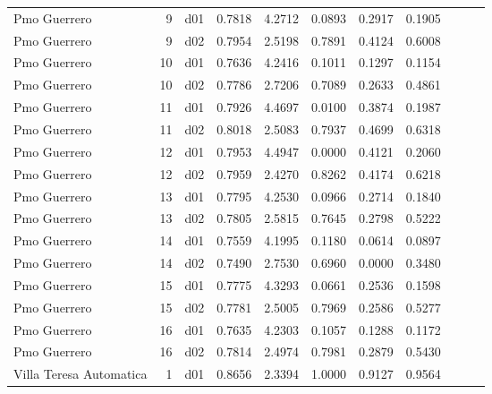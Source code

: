 \begin{landscape}
\begin{longtable}{p{2cm}rrrrrrrrrr}
            Pmo Guerrero  &          9 &     d01 &   0.7818 &  4.2712 &        0.0893 &           0.2917 &  0.1905 \\
            Pmo Guerrero  &          9 &     d02 &   0.7954 &  2.5198 &        0.7891 &           0.4124 &  0.6008 \\
            Pmo Guerrero  &         10 &     d01 &   0.7636 &  4.2416 &        0.1011 &           0.1297 &  0.1154 \\
            Pmo Guerrero  &         10 &     d02 &   0.7786 &  2.7206 &        0.7089 &           0.2633 &  0.4861 \\
            Pmo Guerrero  &         11 &     d01 &   0.7926 &  4.4697 &        0.0100 &           0.3874 &  0.1987 \\
            Pmo Guerrero  &         11 &     d02 &   0.8018 &  2.5083 &        0.7937 &           0.4699 &  0.6318 \\
            Pmo Guerrero  &         12 &     d01 &   0.7953 &  4.4947 &        0.0000 &           0.4121 &  0.2060 \\
            Pmo Guerrero  &         12 &     d02 &   0.7959 &  2.4270 &        0.8262 &           0.4174 &  0.6218 \\
            Pmo Guerrero  &         13 &     d01 &   0.7795 &  4.2530 &        0.0966 &           0.2714 &  0.1840 \\
            Pmo Guerrero  &         13 &     d02 &   0.7805 &  2.5815 &        0.7645 &           0.2798 &  0.5222 \\
            Pmo Guerrero  &         14 &     d01 &   0.7559 &  4.1995 &        0.1180 &           0.0614 &  0.0897 \\
            Pmo Guerrero  &         14 &     d02 &   0.7490 &  2.7530 &        0.6960 &           0.0000 &  0.3480 \\
            Pmo Guerrero  &         15 &     d01 &   0.7775 &  4.3293 &        0.0661 &           0.2536 &  0.1598 \\
            Pmo Guerrero  &         15 &     d02 &   0.7781 &  2.5005 &        0.7969 &           0.2586 &  0.5277 \\
            Pmo Guerrero  &         16 &     d01 &   0.7635 &  4.2303 &        0.1057 &           0.1288 &  0.1172 \\
            Pmo Guerrero  &         16 &     d02 &   0.7814 &  2.4974 &        0.7981 &           0.2879 &  0.5430 \\
 Villa Teresa Automatica  &          1 &     d01 &   0.8656 &  2.3394 &        1.0000 &           0.9127 &  0.9564 \\

\end{longtable}
\end{landscape}
